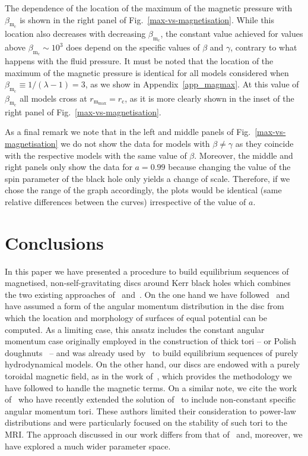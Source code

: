 \documentclass{aa}
\begin{document}
The dependence of the location of the maximum of the magnetic pressure with $\beta_{\mathrm{m}_{\mathrm{c}}}$ is shown in the right panel of Fig.~\ref{max-vs-magnetisation}. While this location also decreases with decreasing $\beta_{\mathrm{m}_{\mathrm{c}}}$, the constant value achieved for values above $\beta_{\mathrm{m}_{\mathrm{c}}}\sim 10^{3}$ does depend on the specific values of $\beta$ and $\gamma$, contrary to what happens with the fluid pressure. It must be noted that the location of the maximum of the magnetic pressure is identical for all models considered when $\beta_{\mathrm{m}_{\mathrm{c}}} \equiv 1/(\lambda - 1) = 3$, as we show in Appendix~\ref{app_magmax}. At this value of $\beta_{\mathrm{m}_{\mathrm{c}}}$ all models cross at $r_{\mathrm{m}_{\mathrm{max}}} = r_{\mathrm{c}}$, as it is more clearly shown in the inset of the right panel of Fig.~\ref{max-vs-magnetisation}.

As a final remark we note that in the left and middle panels of Fig.~\ref{max-vs-magnetisation} we do not show the data for models with $\beta \neq \gamma$ as they coincide with the respective models with the same value of $\beta$. Moreover, the middle and right panels only show the data for $a=0.99$ because changing the value of the spin parameter of the black hole only yields a change of scale. Therefore, if we chose the range of the graph accordingly, the plots would be identical (same relative differences between the curves) irrespective of the value of $a$.

\section{Conclusions}
\label{conclusions}

In this paper we have presented a procedure to build equilibrium sequences of magnetised, non-self-gravitating discs around Kerr black holes which combines the two existing approaches of~\citet{Komissarov:2006} and~\citet{Qian:2009}. On the one hand we have followed~\citet{Qian:2009} and have assumed a form of the angular momentum distribution in the disc from which the location and morphology of surfaces of equal potential can be computed. As a limiting case, this ansatz includes the constant angular momentum case originally employed in the construction of thick tori -- or Polish doughnuts~\citep{Abramowicz:1978,Kozlowski:1978}  -- and was already used by~\citet{Qian:2009} to build equilibrium sequences of purely hydrodynamical models. On the other hand, our discs are endowed with a purely toroidal magnetic field, as in the work of~\citet{Komissarov:2006}, which provides the methodology we have followed to handle the magnetic terms. On a similar note, we cite the work of~\citet{Wielgus:2015} who have recently extended the solution of~\citet{Komissarov:2006} to include non-constant specific angular momentum tori. These authors limited their consideration to power-law distributions and were particularly focused on the stability of such tori to the MRI. The approach discussed in our work differs from that of~\citet{Wielgus:2015} and, moreover, we have explored a much wider parameter space.
\end{document}
